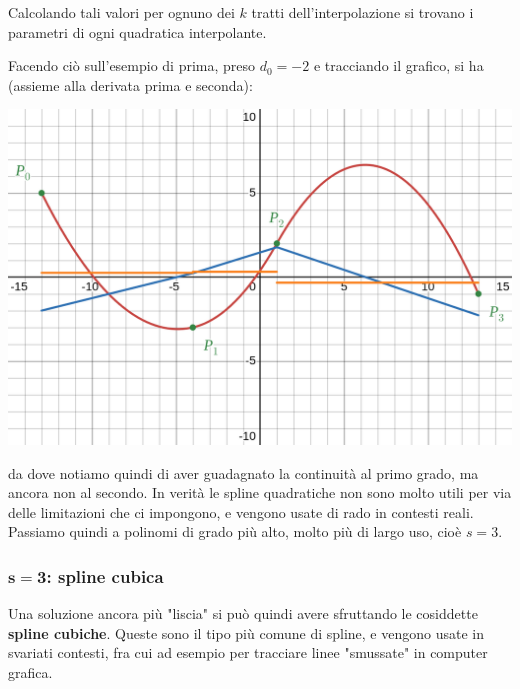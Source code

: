 \documentclass[a4paper,11pt]{article}
\begin{document}
Calcolando tali valori per ognuno dei $k$ tratti dell'interpolazione si trovano i parametri di ogni quadratica interpolante.


Facendo ciò sull'esempio di prima, preso $d_0 = -2$ e tracciando il grafico, si ha (assieme alla derivata prima e seconda):
\begin{center}
	\includegraphics[scale=0.3]{../figures/multipoly_2.png}
\end{center}
da dove notiamo quindi di aver guadagnato la continuità al primo grado, ma ancora non al secondo.
In verità le spline quadratiche non sono molto utili per via delle limitazioni che ci impongono, e vengono usate di rado in contesti reali.
Passiamo quindi a polinomi di grado più alto, molto più di largo uso, cioè $s = 3$.

\subsubsection{$\mathbf{s = 3}$: spline cubica}
Una soluzione ancora più "liscia" si può quindi avere sfruttando le cosiddette \textbf{spline cubiche}.
Queste sono il tipo più comune di spline, e vengono usate in svariati contesti, fra cui ad esempio per tracciare linee "smussate" in computer grafica.
\end{document}
